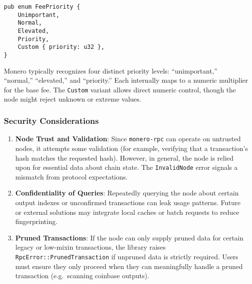 \label{sec:monero-rpc-supporting-types-feepriority}

\begin{verbatim}
pub enum FeePriority {
    Unimportant,
    Normal,
    Elevated,
    Priority,
    Custom { priority: u32 },
}
\end{verbatim}

Monero typically recognizes four distinct priority levels: “unimportant,”
“normal,” “elevated,” and “priority.”  Each internally maps to a numeric
multiplier for the base fee.  The \texttt{Custom} variant allows direct numeric
control, though the node might reject unknown or extreme values.

\subsubsection{Security Considerations}
\label{sec:monero-rpc-security}

\begin{enumerate}
    \item \textbf{Node Trust and Validation}: Since
    \texttt{monero-rpc} can operate on untrusted nodes, it attempts some
    validation (for example, verifying that a transaction’s hash matches the
    requested hash).  However, in general, the node is relied upon for essential
    data about chain state.  The \texttt{InvalidNode} error signals a mismatch
    from protocol expectations.
    
    \item \textbf{Confidentiality of Queries}: Repeatedly querying the node
    about certain output indexes or unconfirmed transactions can leak usage
    patterns.  Future or external solutions may integrate local caches or batch
    requests to reduce fingerprinting.
    
    \item \textbf{Pruned Transactions}: If the node can only supply pruned
    data for certain legacy or low-mixin transactions, the library raises
    \texttt{RpcError::PrunedTransaction} if unpruned data is strictly required.  
    Users must ensure they only proceed when they can meaningfully handle a
    pruned transaction (e.g.\ scanning coinbase outputs).
\end{enumerate}

